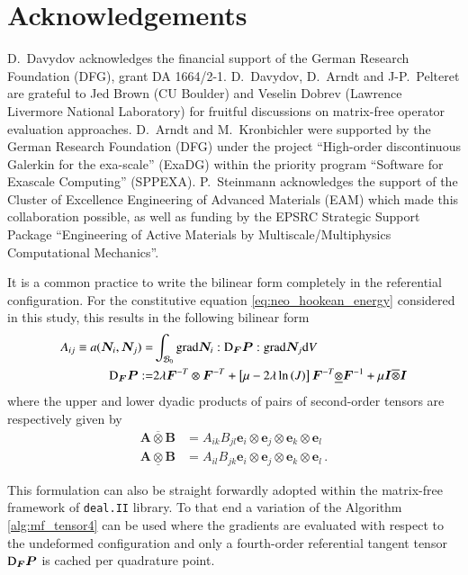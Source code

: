\documentclass[AMA,STIX1COL]{WileyNJD-v2}
\newcommand*{\gz}[1]{\boldsymbol{#1}}
\newcommand*{\grad}{\mathrm{grad}}
\renewcommand*{\d}{\mathrm{d}}
\newcommand*{\mcl}[1]{\mathcal{#1}}
\begin{document}
\section*{Acknowledgements}

D.~Davydov acknowledges the financial support of the German Research Foundation (DFG), grant DA 1664/2-1.
D.~Davydov, D.~Arndt and J-P.~Pelteret are grateful to Jed Brown (CU Boulder) and Veselin Dobrev (Lawrence Livermore National Laboratory) for fruitful discussions on matrix-free operator evaluation approaches.
D.~Arndt and M.~Kronbichler were supported by the German Research Foundation (DFG) under the project ``High-order discontinuous
Galerkin for the exa-scale'' (\mbox{ExaDG}) within the priority program ``Software
for Exascale Computing'' (SPPEXA).
P.~Steinmann acknowledges the support of the Cluster of Excellence Engineering of Advanced Materials (EAM) which made this collaboration possible, as well as funding by the EPSRC Strategic Support Package ``Engineering of Active Materials by Multiscale/Multiphysics Computational Mechanics''.

\appendix

{\color{red}
It is a common practice to write the bilinear form completely in the referential configuration. For the constitutive equation \eqref{eq:neo_hookean_energy} considered in this study, this results in the following bilinear form
}
\begin{align}
  A_{ij} \equiv a(\gz N_i, \gz N_j) =&
  \int_{\mcl B_0}
  \grad \gz N_i : {\rm D}_{\gz F}{\gz P} : \grad \gz N_j
  \d V
  \label{eq:algebraic_tangent_dPdF}
  \\
  {\rm D}_{\gz F}{\gz P} :=&
  2 \lambda
  \gz F^{-T} \otimes \gz F^{-T}
  +
  \left[\mu - 2 \lambda \ln\left( J \right) \right]
  \gz F^{-T} \underline{\otimes} \gz F^{-1}
  +
  \mu \gz I \overline{\otimes} \gz I
\end{align}
where the upper and lower dyadic products of pairs of second-order tensors are respectively given by
\begin{align*}
    \gz A \overline{\otimes} \gz B &= A_{ik} B_{jl} \gz e_i \otimes \gz e_j \otimes \gz e_k \otimes \gz e_l \\
    \gz A \underline{\otimes} \gz B &= A_{il} B_{jk} \gz e_i \otimes \gz e_j \otimes \gz e_k \otimes \gz e_l  \, .
\end{align*}

{\color{red}
This formulation can also be straight forwardly adopted within the matrix-free framework of \texttt{deal.II} library.
To that end a variation of the Algorithm \ref{alg:mf_tensor4} can be used where the gradients are evaluated with respect to the undeformed configuration and only a fourth-order referential tangent tensor ${\rm D}_{\gz F}{\gz P}$ is cached per quadrature point.
}
\end{document}
